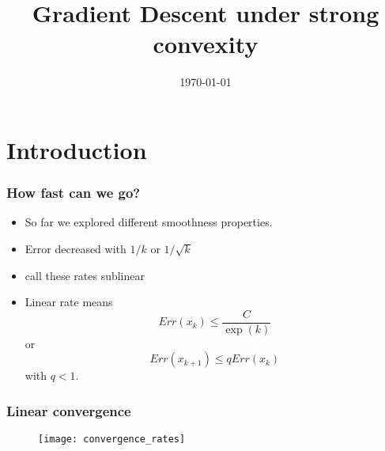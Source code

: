 \documentclass{beamer}
\title{Gradient Descent under strong convexity}
\date{\today}
\begin{document}
\maketitle
\frame{\tableofcontents}

\section{Introduction}%

\begin{frame}
  \frametitle{How fast can we go?}

  \begin{itemize}
    \item So far we explored different smoothness properties.
    \item Error decreased with $1/k$ or $1/\sqrt{k}$
    \item call these rates sublinear
    \item Linear rate means
          \begin{equation}
            Err(x_{k}) \le \frac{C}{\exp(k)}
          \end{equation}
          or
          \begin{equation}
            Err(x_{k+1}) \le q Err(x_k)
          \end{equation}
          with $q<1$.
  \end{itemize}
\end{frame}


\begin{frame}
  \frametitle{Linear convergence}
  \begin{figure}[ht]
    \centering
    \texttt{[image: convergence\_rates]}
  \end{figure}
\end{frame}
\end{document}
